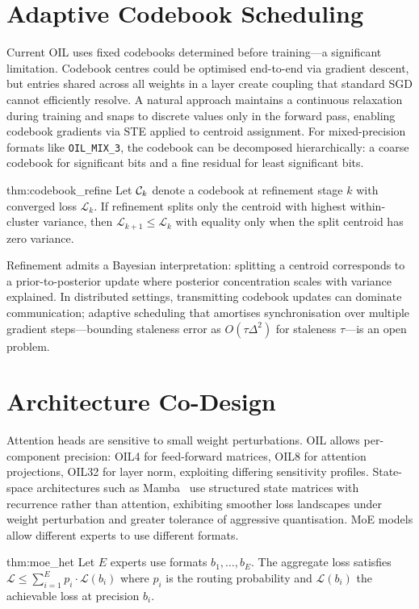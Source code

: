 \section{Adaptive Codebook Scheduling}
\label{sec:adaptive_codebook}
Current OIL uses fixed codebooks determined before training---a significant
limitation. Codebook centres could be optimised end-to-end via gradient
descent, but entries shared across all weights in a layer create coupling
that standard SGD cannot efficiently resolve. A natural approach maintains
a continuous relaxation during training and snaps to discrete values only
in the forward pass, enabling codebook gradients via STE applied to centroid
assignment. For mixed-precision formats like \texttt{OIL\_MIX\_3}, the
codebook can be decomposed hierarchically: a coarse codebook for significant
bits and a fine residual for least significant bits.
\begin{mythm}{thm:codebook_refine}
Let $\mathcal{C}_k$ denote a codebook at refinement stage $k$ with
converged loss $\mathcal{L}_k$. If refinement splits only the centroid
with highest within-cluster variance, then $\mathcal{L}_{k+1} \leq
\mathcal{L}_k$ with equality only when the split centroid has zero
variance.
\end{mythm}
Refinement admits a Bayesian interpretation: splitting a centroid
corresponds to a prior-to-posterior update where posterior concentration
scales with variance explained. In distributed settings, transmitting
codebook updates can dominate communication; adaptive scheduling that
amortises synchronisation over multiple gradient steps---bounding staleness
error as $O(\tau\Delta^2)$ for staleness $\tau$---is an open problem.

\section{Architecture Co-Design}
\label{sec:architecture_codesign}
Attention heads are sensitive to small weight perturbations. OIL allows
per-component precision: OIL4 for feed-forward matrices, OIL8 for attention
projections, OIL32 for layer norm, exploiting differing sensitivity profiles.
State-space architectures such as Mamba~\cite{gu2024} use structured state
matrices with recurrence rather than attention, exhibiting smoother loss
landscapes under weight perturbation and greater tolerance of aggressive
quantisation. MoE models allow different experts to use different formats.
\begin{mythm}{thm:moe_het}
Let $E$ experts use formats $b_1,\dots,b_E$. The aggregate loss satisfies
$\mathcal{L} \leq \sum_{i=1}^{E} p_i \cdot \mathcal{L}(b_i)$ where $p_i$
is the routing probability and $\mathcal{L}(b_i)$ the achievable loss at
precision $b_i$.
\end{mythm}

